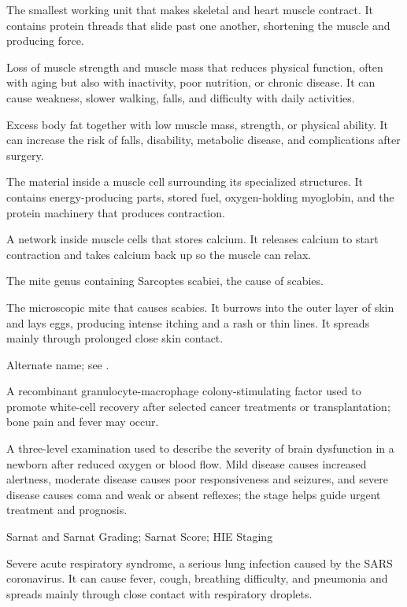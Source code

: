  The smallest working unit that makes skeletal and heart muscle contract. It contains protein threads that slide past one another, shortening the muscle and producing force.

 Loss of muscle strength and muscle mass that reduces physical function, often with aging but also with inactivity, poor nutrition, or chronic disease. It can cause weakness, slower walking, falls, and difficulty with daily activities.

 Excess body fat together with low muscle mass, strength, or physical ability. It can increase the risk of falls, disability, metabolic disease, and complications after surgery.

 The material inside a muscle cell surrounding its specialized structures. It contains energy-producing parts, stored fuel, oxygen-holding myoglobin, and the protein machinery that produces contraction.

 A network inside muscle cells that stores calcium. It releases calcium to start contraction and takes calcium back up so the muscle can relax.

 The mite genus containing Sarcoptes scabiei, the cause of scabies.

 The microscopic mite that causes scabies. It burrows into the outer layer of skin and lays eggs, producing intense itching and a rash or thin lines. It spreads mainly through prolonged close skin contact.

 Alternate name; see .

 A recombinant granulocyte-macrophage colony-stimulating factor used to promote white-cell recovery after selected cancer treatments or transplantation; bone pain and fever may occur.

 A three-level examination used to describe the severity of brain dysfunction in a newborn after reduced oxygen or blood flow. Mild disease causes increased alertness, moderate disease causes poor responsiveness and seizures, and severe disease causes coma and weak or absent reflexes; the stage helps guide urgent treatment and prognosis.

\synonyms
Sarnat and Sarnat Grading; Sarnat Score; HIE Staging

 Severe acute respiratory syndrome, a serious lung infection caused by the SARS coronavirus. It can cause fever, cough, breathing difficulty, and pneumonia and spreads mainly through close contact with respiratory droplets.

